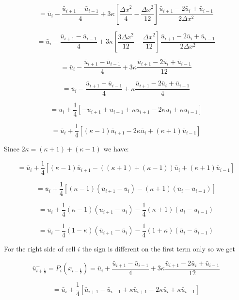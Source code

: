 \documentclass[12pt]{article}
\begin{document}
\[= \bar{u}_i - \frac{\bar{u}_{i+1} - \bar{u}_{i-1}}{4} +  3 \kappa \left[\frac{\Delta x^2}{4} - \frac{\Delta x^2}{12}\right]\frac{\bar{u}_{i+1} - 2\bar{u}_{i} + \bar{u}_{i-1} }{2 \Delta x^2}\]

\[= \bar{u}_i - \frac{\bar{u}_{i+1} - \bar{u}_{i-1}}{4} +  3 \kappa \left[\frac{3\Delta x^2}{12} - \frac{\Delta x^2}{12}\right]\frac{\bar{u}_{i+1} - 2\bar{u}_{i} + \bar{u}_{i-1} }{2 \Delta x^2}\]

\[= \bar{u}_i - \frac{\bar{u}_{i+1} - \bar{u}_{i-1}}{4} +  3 \kappa \frac{\bar{u}_{i+1} - 2\bar{u}_{i} + \bar{u}_{i-1} }{12}\]

\[= \bar{u}_i - \frac{\bar{u}_{i+1} - \bar{u}_{i-1}}{4} +  \kappa \frac{\bar{u}_{i+1} - 2\bar{u}_{i} + \bar{u}_{i-1} }{4}\]

\[= \bar{u}_i +\frac{1}{4}\left[-\bar{u}_{i+1} + \bar{u}_{i-1} +  \kappa \bar{u}_{i+1} - 2\kappa \bar{u}_{i} + \kappa \bar{u}_{i-1} \right]\]

\[= \bar{u}_i +\frac{1}{4}\left[ \left(\kappa -1\right)\bar{u}_{i+1} - 2\kappa \bar{u}_{i} + \left(\kappa + 1\right) \bar{u}_{i-1} \right]\]

Since $2\kappa = (\kappa + 1) + (\kappa -1)$ we have:

\[= \bar{u}_i +\frac{1}{4}\left[ \left(\kappa -1\right)\bar{u}_{i+1} - \left((\kappa + 1) + (\kappa -1)\right) \bar{u}_{i} + \left(\kappa + 1\right) \bar{u}_{i-1} \right]\]

\[= \bar{u}_i +\frac{1}{4}\left[ \left(\kappa -1\right)\left(\bar{u}_{i+1} - \bar{u}_{i}\right) - \left(\kappa + 1\right)\left(\bar{u}_{i} -\bar{u}_{i-1} \right) \right]\]

\[= \bar{u}_i +\frac{1}{4}\left(\kappa -1\right)\left(\bar{u}_{i+1} - \bar{u}_{i}\right) - \frac{1}{4} \left(\kappa + 1\right) \left(\bar{u}_{i} -\bar{u}_{i-1} \right)\]

\[= \bar{u}_i  - \frac{1}{4}\left(1 - \kappa\right)\left(\bar{u}_{i+1} - \bar{u}_{i}\right) - \frac{1}{4} \left(1 + \kappa\right) \left(\bar{u}_{i} -\bar{u}_{i-1} \right)\]

For the right side of cell $i$ the sign is different on the first term only so we get

\[\bar{u}^-_{i + \frac{1}{2}} = P_i(x_{i-\frac{1}{2}}) = \bar{u}_i + \frac{\bar{u}_{i+1} - \bar{u}_{i-1}}{4} +  3 \kappa \frac{\bar{u}_{i+1} - 2\bar{u}_{i} + \bar{u}_{i-1} }{12}\]

\[= \bar{u}_i +\frac{1}{4}\left[\bar{u}_{i+1} - \bar{u}_{i-1} +  \kappa \bar{u}_{i+1} - 2\kappa \bar{u}_{i} + \kappa \bar{u}_{i-1} \right]\]
\end{document}
